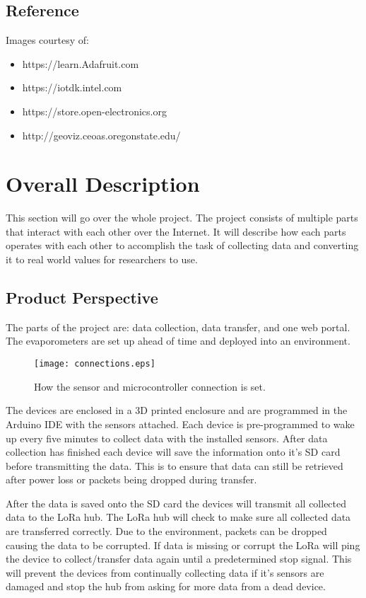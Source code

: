 \documentclass[onecolumn, draftclsnofoot,10pt, compsoc]{IEEEtran}
\begin{document}
\subsection{Reference}
Images courtesy of:
\begin{itemize}
\item https://learn.Adafruit.com
\item https://iotdk.intel.com
\item https://store.open-electronics.org
\item http://geoviz.ceoas.oregonstate.edu/
\end{itemize}

\section{Overall Description}
This section will go over the whole project.  The project consists of multiple parts that interact with each other over the Internet.  It will describe how each parts operates with each other to accomplish the task of collecting data and converting it to real world values for researchers to use.
\subsection{Product Perspective}
The parts of the project are: data collection, data transfer, and one web portal.  The evaporometers are set up ahead of time and deployed into an environment.
\newline
\begin{figure}
 \caption{How the sensor and microcontroller connection is set.}
\texttt{[image: connections.eps]}
\end{figure}


The devices are enclosed in a 3D printed enclosure and are programmed in the Arduino IDE with the sensors attached.  Each device is pre-programmed to wake up every five minutes to collect data with the installed sensors.  After data collection has finished each device will save the information onto it’s SD card before transmitting the data.  This is to ensure that data can still be retrieved after power loss or packets being dropped during transfer.
\newline

After the data is saved onto the SD card the devices will transmit all collected data to the LoRa hub.  The LoRa hub will check to make sure all collected data are transferred correctly.  Due to the environment, packets can be dropped causing the data to be corrupted.  If data is missing or corrupt the LoRa will ping the device to collect/transfer data again until a predetermined stop signal.  This will prevent the devices from continually collecting data if it’s sensors are damaged and stop the hub from asking for more data from a dead device.
\newline
\end{document}
